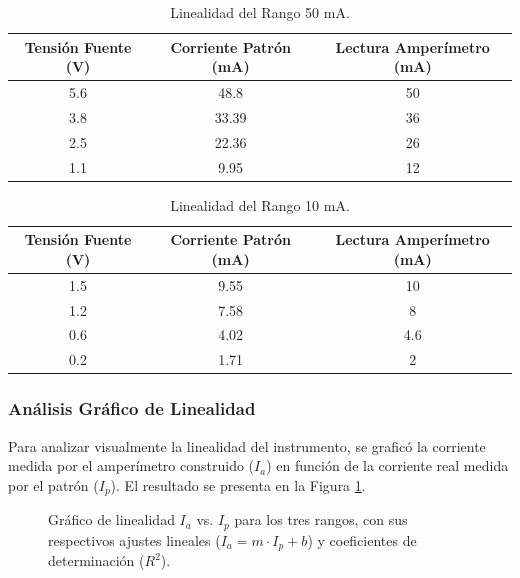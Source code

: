 \begin{table}[h!]
    \centering
    \caption{Linealidad del Rango 50 mA.}
    \label{tab:lin50}
    \begin{tabular}{ccc}
        \toprule
        \textbf{Tensión Fuente (V)} & \textbf{Corriente Patrón (mA)} & \textbf{Lectura Amperímetro (mA)} \\
        \midrule
        5.6 & 48.8 & 50 \\
        3.8 & 33.39 & 36 \\
        2.5 & 22.36 & 26 \\
        1.1 & 9.95 & 12 \\
        \bottomrule
    \end{tabular}
\end{table}

\begin{table}[h!]
    \centering
    \caption{Linealidad del Rango 10 mA.}
    \label{tab:lin10}
    \begin{tabular}{ccc}
        \toprule
        \textbf{Tensión Fuente (V)} & \textbf{Corriente Patrón (mA)} & \textbf{Lectura Amperímetro (mA)} \\
        \midrule
        1.5 & 9.55 & 10 \\
        1.2 & 7.58 & 8 \\
        0.6 & 4.02 & 4.6 \\
        0.2 & 1.71 & 2 \\
        \bottomrule
    \end{tabular}
\end{table}

\subsubsection{Análisis Gráfico de Linealidad}

Para analizar visualmente la linealidad del instrumento, se graficó la corriente medida por el amperímetro construido ($I_a$) en función de la corriente real medida por el patrón ($I_p$). El resultado se presenta en la Figura \ref{fig:linealidad_amp}.

\begin{figure}[h!]
    \centering
    
    \caption{Gráfico de linealidad $I_a$ vs. $I_p$ para los tres rangos,
    con sus respectivos ajustes lineales ($I_a = m \cdot I_p + b$) y
    coeficientes de determinación ($R^2$).}
    \label{fig:linealidad_amp}
\end{figure}

